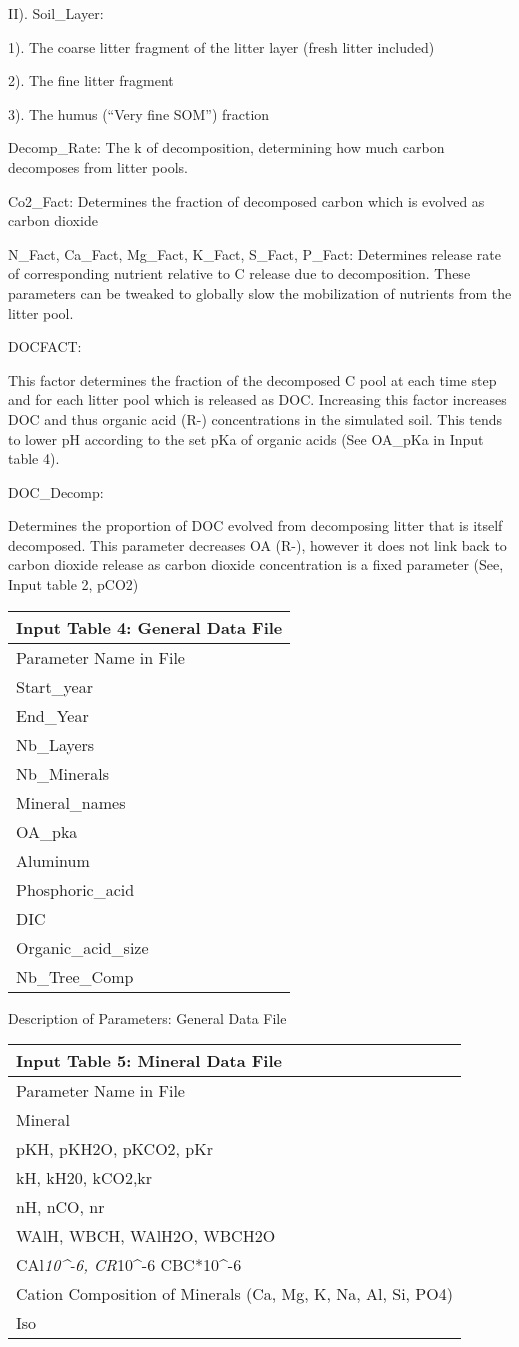 \documentclass[
]{article}
\begin{document}
II). Soil\_Layer:

1). The coarse litter fragment of the litter layer (fresh litter
included)

2). The fine litter fragment

3). The humus (``Very fine SOM'') fraction

Decomp\_Rate: The k of decomposition, determining how much carbon
decomposes from litter pools.

Co2\_Fact: Determines the fraction of decomposed carbon which is evolved
as carbon dioxide

N\_Fact, Ca\_Fact, Mg\_Fact, K\_Fact, S\_Fact, P\_Fact: Determines
release rate of corresponding nutrient relative to C release due to
decomposition. These parameters can be tweaked to globally slow the
mobilization of nutrients from the litter pool.

DOCFACT:

This factor determines the fraction of the decomposed C pool at each
time step and for each litter pool which is released as DOC. Increasing
this factor increases DOC and thus organic acid (R-) concentrations in
the simulated soil. This tends to lower pH according to the set pKa of
organic acids (See OA\_pKa in Input table 4).

DOC\_Decomp:

Determines the proportion of DOC evolved from decomposing litter that is
itself decomposed. This parameter decreases OA (R-), however it does not
link back to carbon dioxide release as carbon dioxide concentration is a
fixed parameter (See, Input table 2, pCO2)

\begin{longtable}[]{@{}l@{}}
\toprule
Input Table 4: General Data File\tabularnewline
\midrule
\endhead
Parameter Name in File\tabularnewline
Start\_year\tabularnewline
End\_Year\tabularnewline
Nb\_Layers\tabularnewline
Nb\_Minerals\tabularnewline
Mineral\_names\tabularnewline
OA\_pka\tabularnewline
Aluminum\tabularnewline
Phosphoric\_acid\tabularnewline
DIC\tabularnewline
Organic\_acid\_size\tabularnewline
Nb\_Tree\_Comp\tabularnewline
\bottomrule
\end{longtable}

Description of Parameters: General Data File

\begin{longtable}[]{@{}l@{}}
\toprule
Input Table 5: Mineral Data File\tabularnewline
\midrule
\endhead
Parameter Name in File\tabularnewline
Mineral\tabularnewline
pKH, pKH2O, pKCO2, pKr\tabularnewline
kH, kH20, kCO2,kr\tabularnewline
nH, nCO, nr\tabularnewline
WAlH, WBCH, WAlH2O, WBCH2O\tabularnewline
CAl\emph{10\^{}-6, CR}10\^{}-6 CBC*10\^{}-6\tabularnewline
Cation Composition of Minerals (Ca, Mg, K, Na, Al, Si,
PO4)\tabularnewline
Iso\tabularnewline
\bottomrule
\end{longtable}
\end{document}
